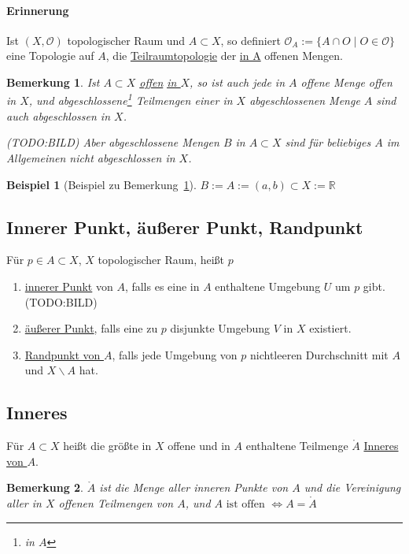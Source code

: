\documentclass[a4paper,11pt,notitlepage]{report}
\newtheorem{remark}{Bemerkung}[chapter]
\newtheorem{example}{Beispiel}[chapter]
\newcommand{\R}{{\ensuremath{\mathbb{R}}}}
\newcommand{\OO}{{\ensuremath{\mathcal{O}}}}
\newenvironment{Kasten}[1]
{
\hspace{0.05\linewidth}
\begin{center}
\begin{minipage}{0.9\linewidth}
\setlength{\fboxsep}{10pt}
\definecolor{shadecolor}{gray}{1}
\definecolor{framecolor}{gray}{0}
\def\FrameCommand{\fcolorbox{framecolor}{shadecolor}}
\MakeFramed {\FrameRestore}
\subsection{#1}
\begin{itshape}
}
{
\end{itshape}
\endMakeFramed
\end{minipage}
\end{center}
}
\begin{document}
\paragraph{Erinnerung}
Ist $(X, \OO)$ topologischer Raum und $A \subset X$, so definiert
$\OO_A := \{ A \cap O \mid O \in \OO \}$ eine Topologie auf $A$, die
 \underline{Teilraumtopologie} der \underline{in A} offenen Mengen.
 
\begin{remark}
	\label{offenAbgeschlossen}
	Ist $A \subset X$ \underline{offen} \underline{\underline{in $X$}}, so ist auch jede in $A$ offene Menge offen in $X$, und abgeschlossene\footnote{in $A$} Teilmengen einer in $X$ abgeschlossenen Menge $A$ sind auch abgeschlossen in $X$.
	
	(TODO:BILD)
	\newline
	Aber abgeschlossene Mengen $B$ in $A \subset X$ sind für beliebiges $A$ im Allgemeinen nicht abgeschlossen in $X$.
\end{remark}

\begin{example}[Beispiel zu Bemerkung~\ref{offenAbgeschlossen}]
	$B := A := (a,b) \subset X := \R$
\end{example}

\begin{Kasten}{Innerer Punkt, äußerer Punkt, Randpunkt}
	Für $p \in A \subset X$, $X$ topologischer Raum, heißt $p$
	\newline
	\begin{enumerate}[(1)]
		\item \underline{innerer Punkt} von $A$, falls es eine in $A$ enthaltene Umgebung $U$ um $p$ gibt. (TODO:BILD)
		\item \underline{äußerer Punkt}, falls eine zu $p$ disjunkte Umgebung $V$ in $X$ existiert.
		\item \underline{Randpunkt von $A$}, falls jede Umgebung von $p$ nichtleeren Durchschnitt mit $A$ und $X \backslash A$ hat.
	\end{enumerate}
\end{Kasten}

\begin{Kasten}{Inneres}
	Für $A \subset X$ heißt die größte in $X$ offene und in $A$ enthaltene Teilmenge $\mathring A$ \underline{Inneres von $A$}.
\end{Kasten}

\begin{remark}
	$\mathring A$ ist die Menge aller inneren Punkte von $A$ und die Vereinigung aller in $X$ offenen Teilmengen von $A$, und $A \text{ ist offen } \Leftrightarrow A = \mathring A$
\end{remark}
\end{document}
